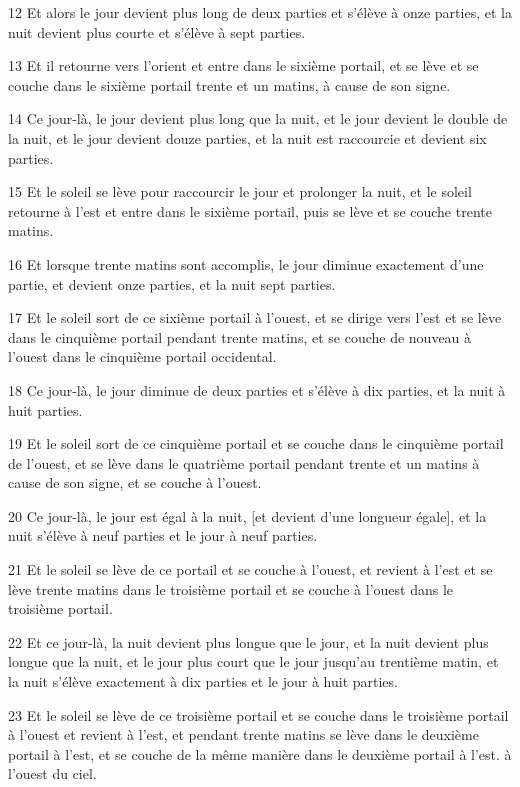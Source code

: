\par 12 Et alors le jour devient plus long de deux parties et s'élève à onze parties, et la nuit devient plus courte et s'élève à sept parties.
\par 13 Et il retourne vers l'orient et entre dans le sixième portail, et se lève et se couche dans le sixième portail trente et un matins, à cause de son signe.
\par 14 Ce jour-là, le jour devient plus long que la nuit, et le jour devient le double de la nuit, et le jour devient douze parties, et la nuit est raccourcie et devient six parties.
\par 15 Et le soleil se lève pour raccourcir le jour et prolonger la nuit, et le soleil retourne à l'est et entre dans le sixième portail, puis se lève et se couche trente matins.
\par 16 Et lorsque trente matins sont accomplis, le jour diminue exactement d'une partie, et devient onze parties, et la nuit sept parties.
\par 17 Et le soleil sort de ce sixième portail à l'ouest, et se dirige vers l'est et se lève dans le cinquième portail pendant trente matins, et se couche de nouveau à l'ouest dans le cinquième portail occidental.
\par 18 Ce jour-là, le jour diminue de deux parties et s'élève à dix parties, et la nuit à huit parties.
\par 19 Et le soleil sort de ce cinquième portail et se couche dans le cinquième portail de l'ouest, et se lève dans le quatrième portail pendant trente et un matins à cause de son signe, et se couche à l'ouest.
\par 20 Ce jour-là, le jour est égal à la nuit, [et devient d'une longueur égale], et la nuit s'élève à neuf parties et le jour à neuf parties.
\par 21 Et le soleil se lève de ce portail et se couche à l'ouest, et revient à l'est et se lève trente matins dans le troisième portail et se couche à l'ouest dans le troisième portail.
\par 22 Et ce jour-là, la nuit devient plus longue que le jour, et la nuit devient plus longue que la nuit, et le jour plus court que le jour jusqu'au trentième matin, et la nuit s'élève exactement à dix parties et le jour à huit parties.
\par 23 Et le soleil se lève de ce troisième portail et se couche dans le troisième portail à l'ouest et revient à l'est, et pendant trente matins se lève dans le deuxième portail à l'est, et se couche de la même manière dans le deuxième portail à l'est. à l'ouest du ciel.
